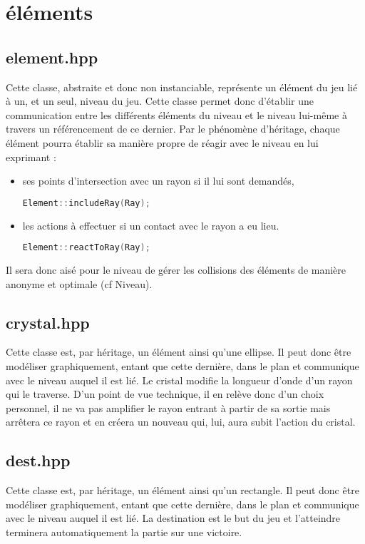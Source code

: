 \documentclass[a4paper,11pt]{report}
\begin{document}
\section[Les éléments]{éléments}
\subsection[Element]{element.hpp}
Cette classe, abstraite et donc non instanciable, représente un élément du jeu
lié à un, et un seul, niveau du jeu. Cette classe permet donc d'établir une
communication entre les différents éléments du niveau et le niveau lui-même à
travers un référencement de ce dernier.
Par le phénomène d'héritage, chaque élément pourra établir sa manière propre de
réagir avec le niveau en lui exprimant : 
\begin{itemize}
	\item ses points d'intersection avec un rayon si il lui sont demandés,
		\begin{lstlisting}[language=C++]
		Element::includeRay(Ray);
		\end{lstlisting}
	\item les actions à effectuer si un contact avec le rayon a eu lieu.
		\begin{lstlisting}[language=C++]
		Element::reactToRay(Ray);
		\end{lstlisting}
\end{itemize}
Il sera donc aisé pour le niveau de gérer les collisions des éléments de manière
anonyme et optimale (cf Niveau).
\subsection[Cristal]{crystal.hpp}
\begin{center}
\end{center}
Cette classe est, par héritage, un élément ainsi qu'une ellipse. Il peut donc
être modéliser graphiquement, entant que cette dernière, dans le plan et communique avec
le niveau auquel il est lié. Le cristal modifie la longueur d'onde d'un rayon
qui le traverse. D'un point de vue technique, il en relève donc d'un choix
personnel, il ne va pas amplifier le rayon entrant à partir de sa sortie mais 
arrêtera ce rayon et en créera un nouveau qui, lui, aura subit l'action du cristal.
\subsection[Destination]{dest.hpp}
Cette classe est, par héritage, un élément ainsi qu'un rectangle. Il peut donc
être modéliser graphiquement, entant que cette dernière, dans le plan et
communique avec le niveau auquel il est lié. La destination est le but du jeu
et l'atteindre terminera automatiquement la partie sur une victoire.
\end{document}
